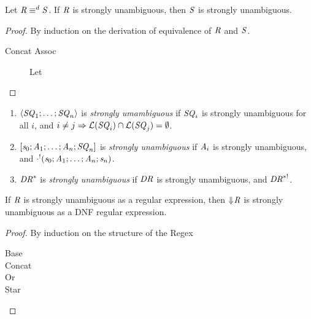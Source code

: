 \documentclass[numbers]{sigplanconf}
\begin{document}
\begin{lemma}
  Let $\mathit{R} \equiv^d \mathit{S}$.  If $\mathit{R}$ is strongly
  unambiguous, then $\mathit{S}$ is strongly unambiguous.
\end{lemma}
\begin{proof}
  By induction on the derivation of equivalence of $\mathit{R}$ and $\mathit{S}$.
  \begin{description}
  \item[Concat Assoc] Let 
  \end{description}
\end{proof}

\begin{definition}
  \leavevmode
  \begin{enumerate}
  \item $\langle\mathit{SQ}_1;\ldots;\mathit{SQ}_n\rangle$ is \emph{strongly umambiguous}
    if $\mathit{SQ}_i$ is strongly unambiguous for all $i$, and $i\neq j
    \Rightarrow
    \mathcal{L}(\mathit{SQ}_i)\cap\mathcal{L}(\mathit{SQ}_j)=\emptyset$.
  \item $[\mathit{s}_0;\mathit{A}_1;\ldots;\mathit{A}_n;\mathit{SQ}_n]$ is
    \emph{strongly unambiguous} if $\mathit{A}_i$ is strongly unambiguous, and
    $\cdot^!(\mathit{s}_0;\mathit{A}_1;\ldots;\mathit{A}_n;\mathit{s}_n)$.
  \item ${\mathit{DR}}^*$ is \emph{strongly unambiguous} if $\mathit{DR}$ is
    strongly unambiguous, and $\mathit{DR}^{*!}$.
  \end{enumerate}
\end{definition}

\begin{lemma}
  \label{lem:retaining-unambiguity}
  If $\mathit{R}$ is strongly unambiguous as a regular expression, then
  $\Downarrow\mkern-4mu \mathit{R}$ is strongly unambiguous as a DNF regular expression.
\end{lemma}
\begin{proof}
  By induction on the structure of the Regex
  \begin{description}
  \item[Base]
  \item[Concat]
  \item[Or]
  \item[Star]
  \end{description}
\end{proof}
\end{document}
